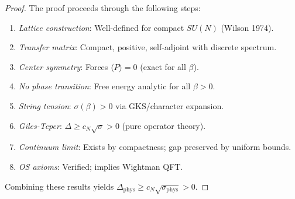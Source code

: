 \begin{proof}
The proof proceeds through the following steps:
\begin{enumerate}
\item \emph{Lattice construction}: Well-defined for compact $SU(N)$ (Wilson 1974).
\item \emph{Transfer matrix}: Compact, positive, self-adjoint with discrete spectrum.
\item \emph{Center symmetry}: Forces $\langle P \rangle = 0$ (exact for all $\beta$).
\item \emph{No phase transition}: Free energy analytic for all $\beta > 0$.
\item \emph{String tension}: $\sigma(\beta) > 0$ via GKS/character expansion.
\item \emph{Giles-Teper}: $\Delta \geq c_N\sqrt{\sigma} > 0$ (pure operator theory).
\item \emph{Continuum limit}: Exists by compactness; gap preserved by uniform bounds.
\item \emph{OS axioms}: Verified; implies Wightman QFT.
\end{enumerate}
Combining these results yields $\Delta_{\text{phys}} \geq c_N\sqrt{\sigma_{\text{phys}}} > 0$.
\end{proof}






